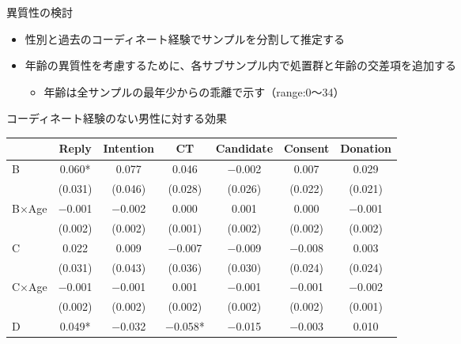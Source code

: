\documentclass[
      aspectratio=169,
        12pt,
    ]{beamer}
\providecommand{\tightlist}{%
  \setlength{\itemsep}{0pt}\setlength{\parskip}{0pt}}
\begin{document}
\begin{frame}{異質性の検討}
\protect\hypertarget{ux7570ux8ceaux6027ux306eux691cux8a0e}{}
\begin{itemize}
\tightlist
\item
  性別と過去のコーディネート経験でサンプルを分割して推定する
\item
  年齢の異質性を考慮するために、各サブサンプル内で処置群と年齢の交差項を追加する

  \begin{itemize}
  \tightlist
  \item
    年齢は全サンプルの最年少からの乖離で示す（range:0～34）
  \end{itemize}
\end{itemize}
\end{frame}

\begin{frame}{コーディネート経験のない男性に対する効果}
\protect\hypertarget{ux30b3ux30fcux30c7ux30a3ux30cdux30fcux30c8ux7d4cux9a13ux306eux306aux3044ux7537ux6027ux306bux5bfeux3059ux308bux52b9ux679c}{}
\begin{table}
\centering
\fontsize{9}{11}\selectfont
\begin{tabular}[t]{lcccccc}
\toprule
  & Reply & Intention & CT & Candidate & Consent & Donation\\
\midrule
B & \num{0.060}* & \num{0.077} & \num{0.046} & \num{-0.002} & \num{0.007} & \num{0.029}\\
 & (\num{0.031}) & (\num{0.046}) & (\num{0.028}) & (\num{0.026}) & (\num{0.022}) & (\num{0.021})\\
B×Age & \num{-0.001} & \num{-0.002} & \num{0.000} & \num{0.001} & \num{0.000} & \num{-0.001}\\
 & (\num{0.002}) & (\num{0.002}) & (\num{0.001}) & (\num{0.002}) & (\num{0.002}) & \vphantom{1} (\num{0.002})\\
C & \num{0.022} & \num{0.009} & \num{-0.007} & \num{-0.009} & \num{-0.008} & \num{0.003}\\
 & (\num{0.031}) & (\num{0.043}) & (\num{0.036}) & (\num{0.030}) & (\num{0.024}) & (\num{0.024})\\
C×Age & \num{-0.001} & \num{-0.001} & \num{0.001} & \num{-0.001} & \num{-0.001} & \num{-0.002}\\
 & (\num{0.002}) & (\num{0.002}) & (\num{0.002}) & (\num{0.002}) & (\num{0.002}) & (\num{0.001})\\
D & \num{0.049}* & \num{-0.032} & \num{-0.058}* & \num{-0.015} & \num{-0.003} & \num{0.010}\\

\end{tabular}
\end{table}
\end{frame}
\end{document}
